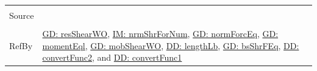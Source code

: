 \documentclass[12pt]{article}
\begin{document}
\begin{minipage}{\textwidth}
\begin{tabular}{>{\raggedright}p{}>{\raggedright\arraybackslash}p{}}
\\ \midrule \\
Source & \cite{fredlund1977}
         
\\ \midrule \\
RefBy & \hyperref[GD:resShearWO]{GD: resShearWO}, \hyperref[IM:nrmShrForNum]{IM: nrmShrForNum}, \hyperref[GD:normForcEq]{GD: normForcEq}, \hyperref[GD:momentEql]{GD: momentEql}, \hyperref[GD:mobShearWO]{GD: mobShearWO}, \hyperref[DD:lengthLb]{DD: lengthLb}, \hyperref[GD:bsShrFEq]{GD: bsShrFEq}, \hyperref[DD:convertFunc2]{DD: convertFunc2}, and \hyperref[DD:convertFunc1]{DD: convertFunc1}
        
\\ \bottomrule
\end{tabular}
\end{minipage}
\end{document}
